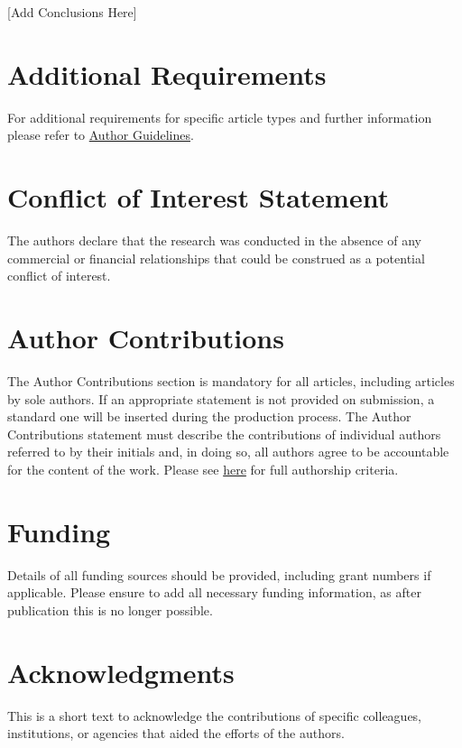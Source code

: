 \documentclass[utf8]{frontiersSCNS}
\begin{document}
[Add Conclusions Here]


\section{Additional Requirements}

For additional requirements for specific article types and further information please refer to \href{http://www.frontiersin.org/about/AuthorGuidelines#AdditionalRequirements}{Author Guidelines}.

\section*{Conflict of Interest Statement}

The authors declare that the research was conducted in the absence of any commercial or financial relationships that could be construed as a potential conflict of interest.

\section*{Author Contributions}

The Author Contributions section is mandatory for all articles, including articles by sole authors. If an appropriate statement is not provided on submission, a standard one will be inserted during the production process. The Author Contributions statement must describe the contributions of individual authors referred to by their initials and, in doing so, all authors agree to be accountable for the content of the work. Please see  \href{http://home.frontiersin.org/about/author-guidelines#AuthorandContributors}{here} for full authorship criteria.

\section*{Funding}
Details of all funding sources should be provided, including grant numbers if applicable. Please ensure to add all necessary funding information, as after publication this is no longer possible.

\section*{Acknowledgments}
This is a short text to acknowledge the contributions of specific colleagues, institutions, or agencies that aided the efforts of the authors.
\end{document}

